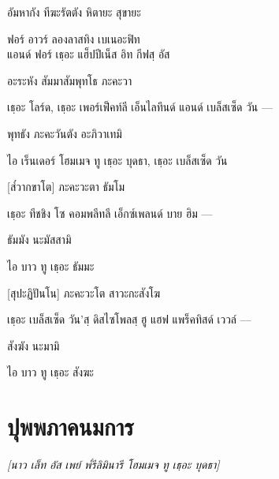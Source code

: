 อัมหากัง ทีฆะรัตตัง หิตายะ สุขายะ

\begin{english}
ฟอร์ อาวร์ ลองลาสทิง เบเนอะฟิท\\
\vin แอนด์ ฟอร์ เธฺอะ แฮ็ปปีเน็ส อิท กีฟสฺ อัส
\end{english}

อะระหัง สัมมาสัมพุทโธ ภะคะวา

\begin{english}
เธฺอะ โลร์ด, เธฺอะ เพอร์เฟ็คท์ลี เอ็นไลทึนด์ แอนด์ เบล็สเซ็ด วัน —
\end{english}

พุทธัง ภะคะวันตัง อะภิวาเทมิ

\begin{english}
ไอ เร็นเดอร์ โฮมเมจ ทู เธฺอะ บุดธา, เธฺอะ เบล็สเซ็ด วัน  
\end{english}

[ส๎วากขาโต] ภะคะวะตา ธัมโม

\begin{english}
เธฺอะ ทีชชิง  โซ คอมพลีทลี เอ็กซ์เพลนด์ บาย ฮิม —
\end{english}

ธัมมัง นะมัสสามิ

\begin{english}
	ไอ บาว ทู เธฺอะ ธัมมะ  
\end{english}

[สุปะฏิปันโน] ภะคะวะโต สาวะกะสังโฆ

\begin{english}
เธฺอะ เบล็สเซ็ด วัน’สฺ ดิสไซโพลสฺ ฮู แฮฟ แพร็คทิสด์ เววล์ —
\end{english}

สังฆัง นะมามิ

\begin{english}
	ไอ บาว ทู เธฺอะ สังฆะ 
\end{english}

\chapter{ปุพพภาคนมการ}

\begin{leader}
\end{leader}

\begin{leader}
\textit{[นาว เล็ท อัส เพย์ พ๎รีลิมินารี โฮมเมจ ทู เธฺอะ บุดธา]}
\end{leader}

